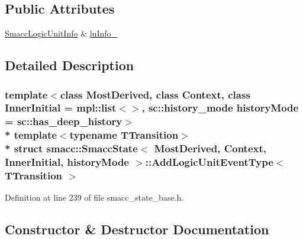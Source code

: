 \subsection*{Public Attributes}
\begin{DoxyCompactItemize}
\item 
\hyperlink{structsmacc_1_1SmaccLogicUnitInfo}{Smacc\+Logic\+Unit\+Info} \& \hyperlink{structsmacc_1_1SmaccState_1_1AddLogicUnitEventType_a31c27ea945cd0127080c0bae872c028e}{lu\+Info\+\_\+}
\end{DoxyCompactItemize}


\subsection{Detailed Description}
\subsubsection*{template$<$class Most\+Derived, class Context, class Inner\+Initial = mpl\+::list$<$$>$, sc\+::history\+\_\+mode history\+Mode = sc\+::has\+\_\+deep\+\_\+history$>$\\*
template$<$typename T\+Transition$>$\\*
struct smacc\+::\+Smacc\+State$<$ Most\+Derived, Context, Inner\+Initial, history\+Mode $>$\+::\+Add\+Logic\+Unit\+Event\+Type$<$ T\+Transition $>$}



Definition at line 239 of file smacc\+\_\+state\+\_\+base.\+h.



\subsection{Constructor \& Destructor Documentation}
